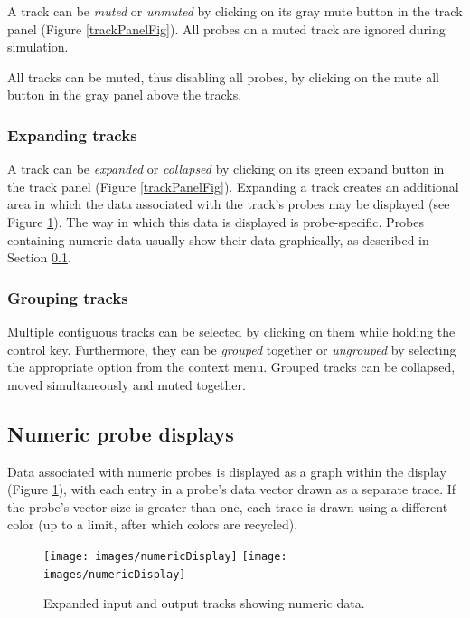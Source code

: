 \documentclass{article}
\begin{document}
A track can be {\it muted} or {\it unmuted} by clicking on its gray mute button
in the track panel (Figure \ref{trackPanelFig}). All probes on a muted track are
ignored during simulation.

All tracks can be muted, thus disabling all probes, by clicking
on the mute all button in the gray panel above the tracks.

\subsubsection{Expanding tracks}

A track can be {\it expanded} or {\it collapsed} by clicking on its green
expand button in the track panel (Figure \ref{trackPanelFig}). Expanding a track
creates an additional area in which the data associated with the
track's probes may be displayed (see Figure \ref{numericDisplayFig}). The way
in which this data is displayed is probe-specific. Probes containing
numeric data usually show their data graphically, as described in
Section \ref{numericProbeDisplaysSec}.

\subsubsection{Grouping tracks}

Multiple contiguous tracks can be selected by clicking on them while
holding the control key.  Furthermore, they can be {\it grouped} together
or {\it ungrouped} by selecting the appropriate option from the context
menu.  Grouped tracks can be collapsed, moved simultaneously and
muted together.

\subsection{Numeric probe displays}
\label{numericProbeDisplaysSec}

Data associated with numeric probes is displayed as a graph within the
display (Figure \ref{numericDisplayFig}), with each entry in a probe's
data vector drawn as a separate trace.  If the probe's vector size is
greater than one, each trace is drawn using a different color (up to a
limit, after which colors are recycled).

\begin{figure}
\begin{center}
\iflatexml
\texttt{[image: images/numericDisplay]}
\else
\texttt{[image: images/numericDisplay]}
\fi
\end{center}
\caption{Expanded input and output tracks showing numeric data.}%
\label{numericDisplayFig}
\end{figure}
\end{document}
